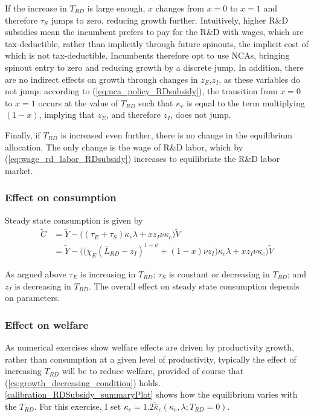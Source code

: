 \documentclass[11pt,english]{article}
\theoremstyle{remark}
\begin{document}
If the increase in $T_{RD}$ is large enough, $x$ changes from $x = 0$ to $x = 1$ and therefore $\tau_S$ jumps to zero, reducing growth further. Intuitively, higher R\&D subsidies mean the incumbent prefers to pay for the R\&D with wages, which are tax-deductible, rather than implicitly through future spinouts, the implicit cost of which is not tax-deductible. Incumbents therefore opt to use NCAs, bringing spinout entry to zero and reducing growth by a discrete jump. In addition, there are no indirect effects on growth through changes in $z_E$,$z_I$, as these variables do not jump: according to (\ref{eq:nca_policy_RDsubsidy}), the transition from $x= 0$ to $x =1$ occurs at the value of $T_{RD}$ such that $\kappa_c$ is equal to the term multiplying $(1-x)$, implying that $z_E$, and therefore $z_I$, does not jump.

Finally, if $T_{RD}$ is increased even further, there is no change in the equilibrium allocation. The only change is the wage of R\&D labor, which by (\ref{eq:wage_rd_labor_RDsubsidy}) increases to equilibriate the R\&D labor market.

\subsubsection{Effect on consumption}

Steady state consumption is given by
\begin{align}
\tilde{C} &= \tilde{Y} - \Big( (\tau_E  + \tau_S)\kappa_e \lambda + x z_I \nu \kappa_c \Big) \tilde{V} \\
&= \tilde{Y} - \Big( \big( \chi_E (\bar{L}_{RD} - z_I)^{1-\psi} + (1-x) \nu z_I \big) \kappa_e \lambda + x z_I \nu \kappa_c \Big) \tilde{V}  \label{cs:scen2:consumption_eq}
\end{align}

As argued above $\tau_E$ is increasing in $T_{RD}$; $\tau_S$ is constant or decreasing in $T_{RD}$; and $z_I$ is decreasing in $T_{RD}$. The overall effect on steady state consumption depends on parameters. 

\subsubsection{Effect on welfare}

As numerical exercises show welfare effects are driven by productivity growth, rather than consumption at a given level of productivity, typically the effect of increasing $T_{RD}$ will be to reduce welfare, provided of course that (\ref{cs:growth_decreasing_condition}) holds. \autoref{calibration_RDSubsidy_summaryPlot} shows how the equilibrium varies with the $T_{RD}$. For this exercise, I set $\kappa_c = 1.2 \tilde{\bar{\kappa}}_c(\kappa_e,\lambda;T_{RD} = 0)$. 
\end{document}
